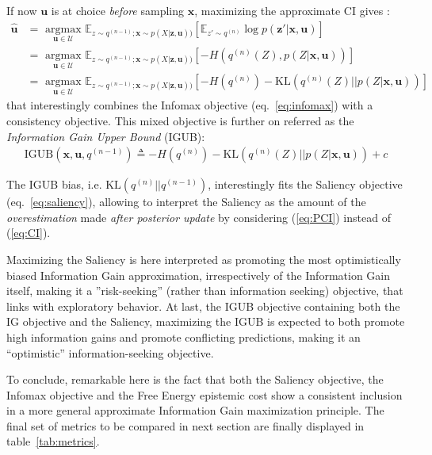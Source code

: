 \documentclass[12pt,twoside,openright]{article}
\begin{document}
If now $\boldsymbol{u}$ is at choice \emph{before} sampling  $\boldsymbol{x}$, maximizing the approximate CI gives :
\begin{align}
	\hat{\boldsymbol{u}} 
	&= \underset{\boldsymbol{u} \in \mathcal{U}}{\text{ argmax }} \mathbb{E}_{z\sim q^{(n-1)}; \boldsymbol{x}\sim p(X|\boldsymbol{z},\boldsymbol{u}))} 
	\left[\mathbb{E}_{z'\sim q^{(n)} }\log p(\boldsymbol{z}'|\boldsymbol{x}, \boldsymbol{u})\right]\nonumber\\
	&= \underset{\boldsymbol{u} \in \mathcal{U}}{\text{ argmax }} \mathbb{E}_{z\sim q^{(n-1)}; \boldsymbol{x}\sim p(X|\boldsymbol{z},\boldsymbol{u}))} \left[-H(q^{(n)}(Z), p(Z|\boldsymbol{x}, \boldsymbol{u}))\right]\\
	&= \underset{\boldsymbol{u} \in \mathcal{U}}{\text{ argmax }} \mathbb{E}_{z\sim q^{(n-1)}; \boldsymbol{x}\sim p(X|\boldsymbol{z},\boldsymbol{u}))} \left[-H(q^{(n)}) - \text{KL}(q^{(n)}(Z)|| p(Z|\boldsymbol{x}, \boldsymbol{u}))\right]\label{eq:PC-pred}
\end{align}
that interestingly combines the Infomax objective (eq.~\ref{eq:infomax}) with a consistency objective. This mixed objective is further on referred as the \emph{Information Gain Upper Bound} (IGUB):
\begin{align}\text{IGUB}(\boldsymbol{x}, \boldsymbol{u}, q^{(n-1)})\triangleq -H(q^{(n)}) - \text{KL}(q^{(n)}(Z)|| p(Z|\boldsymbol{x}, \boldsymbol{u})) + c \label{eq:PC}
\end{align}

The IGUB bias, i.e. $\text{KL} (q^{(n)}||q^{(n-1)})$, interestingly fits the Saliency objective (eq.~\ref{eq:saliency}), allowing to interpret the Saliency as the amount of the \emph{overestimation} made \emph{after posterior update} by considering (\ref{eq:PCI}) instead of (\ref{eq:CI}).

Maximizing the Saliency is here interpreted as promoting the most optimistically biased Information Gain approximation, irrespectively of the Information Gain itself, making it a ''risk-seeking'' (rather than information seeking) objective, that links with exploratory behavior.
At last, the IGUB objective containing both the IG objective and the Saliency, maximizing the IGUB is expected to both promote high information gains and promote conflicting predictions, making it an ``optimistic'' information-seeking objective.

To conclude, remarkable here is the fact that both the Saliency objective, the Infomax  objective and the Free Energy epistemic cost show a consistent inclusion in a more general approximate Information Gain maximization principle. 
The final set of metrics to be compared in next section are finally displayed in table~\ref{tab:metrics}.
\end{document}
